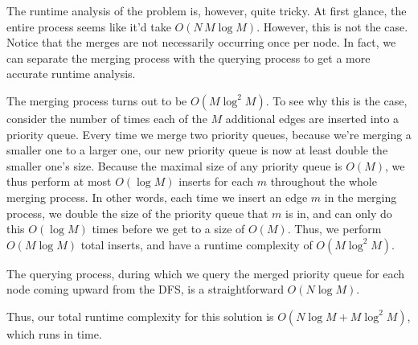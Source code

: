 \documentclass[11pt]{article}
\begin{document}
    The runtime analysis of the problem is, however, quite tricky. At first glance, the entire process seems like it'd take $O(N\,M\log M)$. However, this is not the case. Notice that the merges are not necessarily occurring once per node. In fact, we can separate the merging process with the querying process to get a more accurate runtime analysis.
    
    The merging process turns out to be $O(M \log ^2 M)$. To see why this is the case, consider the number of times each of the $M$ additional edges are inserted into a priority queue. Every time we merge two priority queues, because we're merging a smaller one to a larger one, our new priority queue is now at least double the smaller one's size. Because the maximal size of any priority queue is $O(M)$, we thus perform at most $O(\log M)$ inserts for each $m$ throughout the whole merging process. In other words, each time we insert an edge $m$ in the merging process, we double the size of the priority queue that $m$ is in, and can only do this $O(\log M)$ times before we get to a size of $O(M)$. Thus, we perform $O(M \log M)$ total inserts, and have a runtime complexity of $O(M \log^2 M)$.
    
    The querying process, during which we query the merged priority queue for each node coming upward from the DFS, is a straightforward $O(N \log M)$.
    
    Thus, our total runtime complexity for this solution is $O(N\log M+M\log^2 M)$, which runs in time.
        
        
        
\end{document}
